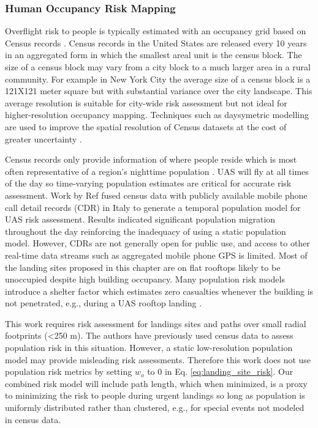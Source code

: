 \subsubsection{Human Occupancy Risk Mapping}\label{sec:ch5_occupancy_cost}

Overflight risk to people is typically estimated with an occupancy grid based on Census records \cite{stevenson_estimated_2015-1, ten_harmsel_emergency_2017, ancel_real-time_2017}.  Census records in the United States are released every 10 years in an aggregated form in which the smallest areal unit is the census block. The size of a census block may vary from a city block to a much larger area in a rural community. For example in New York City the average size of a census block is a 121X121 meter square but with substantial variance over the city landscape.  This average resolution is suitable for city-wide risk assessment but not ideal for higher-resolution occupancy mapping. Techniques such as daysymetric modelling \cite{nagle_dasymetric_2014-1} are used to improve the spatial resolution of Census datasets at the cost of greater uncertainty \cite{dmowska_high_2017-1}.

Census records only provide information of where people reside which is most often representative of a region's nighttime population \cite{di_donato_evaluating_2017}.  UAS will fly at all times of the day so time-varying population estimates are critical for accurate risk assessment. Work by Ref \cite{di_donato_evaluating_2017} fused census data with  publicly available mobile phone call detail records (CDR) in Italy to generate a temporal population model for UAS risk assessment. Results indicated significant population migration throughout the day reinforcing the inadequacy of using a static population model. However, CDRs are not generally open for public use, and access to other real-time data streams such as aggregated mobile phone GPS is limited. Most of the landing sites proposed in this chapter are on flat rooftops likely to be unoccupied despite high building occupancy. Many population risk models introduce a shelter factor which estimates zero casualties whenever the building is not penetrated, e.g., during a UAS rooftop landing \cite{melnyk_third-party_2014-1}.

This work requires risk assessment for landings sites and paths over small radial footprints (<250 m). The authors have previously used census data to assess population risk in this situation. However, a static low-resolution population model may provide misleading risk assessments. Therefore this work does not use population risk metrics by setting $w_o$ to 0 in Eq. \ref{eq:landing_site_risk}. Our combined risk model will include path length, which when minimized, is a proxy to minimizing the risk to people during urgent landings so long as population is uniformly distributed rather than clustered, e.g., for special events not modeled in census data.

